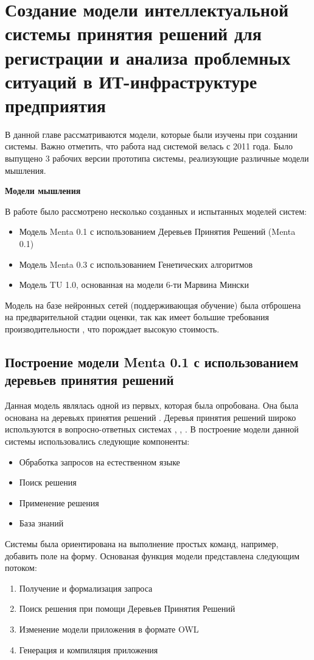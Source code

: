 \chapter{Создание модели интеллектуальной системы принятия решений для регистрации и анализа проблемных ситуаций в ИТ-инфраструктуре предприятия} \label{chapt3}

В данной главе рассматриваются модели, которые были изучены при создании системы. Важно отметить, что работа над системой велась с 2011 года. Было выпущено 3 рабочих версии прототипа системы, реализующие различные модели мышления. 
\par \textbf{Модели мышления} \par
В работе было рассмотрено несколько созданных и испытанных моделей систем: \begin{itemize}
	\item Модель Menta 0.1 с использованием Деревьев Принятия Решений (Menta 0.1)
	\item Модель Menta 0.3 с использованием Генетических алгоритмов \cite{ArtificialIntelligence} 
	\item Модель TU 1.0, основанная на модели 6-ти Марвина Мински  \cite{EmotionMachine}
\end{itemize}

Модель на базе нейронных сетей (поддерживающая обучение) была отброшена на предварительной стадии оценки, так как имеет большие требования производительности \cite{NEURAL}, что порождает высокую стоимость.


\section{Построение модели Menta 0.1 с использованием деревьев принятия решений} \label{sect3_1}
Данная модель являлась одной из первых, которая была опробована. Она была основана на деревьях принятия решений \cite{DTREE}. Деревья принятия решений широко используются в вопросно-ответных системах \cite{DC1}, \cite{DC2}, \cite{DC3}. В построение модели данной системы использовались следующие компоненты:
\begin{itemize}
	\item Обработка запросов на естественном языке
	\item Поиск решения
	\item Применение решения
	\item База знаний
\end{itemize} \par
Системы была ориентирована на выполнение простых команд, например, добавить поле на форму. Основаная функция модели представлена следующим потоком:
\begin{enumerate}
	\item Получение и формализация запроса
	\item Поиск решения при помощи Деревьев Принятия Решений
	\item Изменение модели приложения в формате OWL \cite{OWL}
	\item Генерация и компиляция приложения
\end{enumerate}

